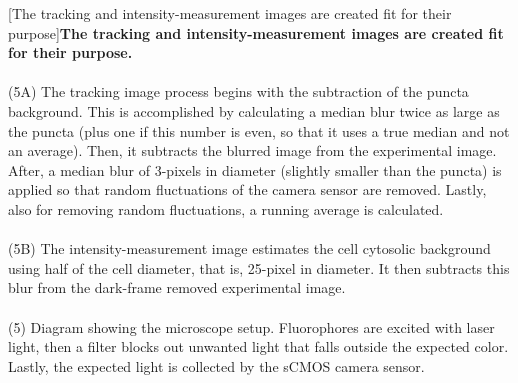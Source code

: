\begin{centering}
\captionsetup{parbox=none}
[The tracking and intensity-measurement images are created fit for their purpose]{\textbf{The tracking and intensity-measurement images are created fit for their purpose.}
\\
\\
(5A) The tracking image process begins with the subtraction of the puncta background. This is accomplished by calculating a median blur twice as large as the puncta (plus one if this number is even, so that it uses a true median and not an average). Then, it subtracts the blurred image from the experimental image. After, a median blur of 3-pixels in diameter (slightly smaller than the puncta) is applied so that random fluctuations of the camera sensor are removed. Lastly, also for removing random fluctuations, a running average is calculated.
\\
\\
(5B) The intensity-measurement image estimates the cell cytosolic background using half of the cell diameter, that is, 25-pixel in diameter. It then subtracts this blur from the dark-frame removed experimental image.
\\
\\
(5) Diagram showing the microscope setup. Fluorophores are excited with laser light, then a filter blocks out unwanted light that falls outside the expected color. Lastly, the expected light is collected by the sCMOS camera sensor.}
\label{m:2}
\end{centering}

